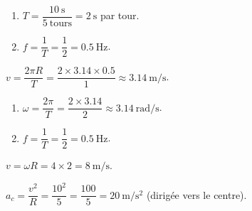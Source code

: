 \documentclass[11pt,a4paper]{article}
\begin{document}

\begin{corrige}
\begin{enumerate}[label=\alph*)]
  \item $T=\dfrac{\qty{10}{\second}}{5\ \text{tours}}=\qty{2}{\second}$ par tour.
  \item $f=\dfrac{1}{T}=\dfrac{1}{2}=\qty{0,5}{\hertz}$.
\end{enumerate}
\end{corrige}

\begin{corrige}
$v=\dfrac{2\pi R}{T}=\dfrac{2\times\num{3,14}\times\num{0,5}}{1}\approx\qty{3,14}{\metre\per\second}$.
\end{corrige}

\begin{corrige}
\begin{enumerate}[label=\alph*)]
  \item $\omega=\dfrac{2\pi}{T}=\dfrac{2\times\num{3,14}}{2}\approx\qty{3,14}{\radian\per\second}$.
  \item $f=\dfrac{1}{T}=\dfrac{1}{2}=\qty{0,5}{\hertz}$.
\end{enumerate}
\end{corrige}

\begin{corrige}
$v=\omega R=4\times 2=\qty{8}{\metre\per\second}$.
\end{corrige}

\begin{corrige}
$a_c=\dfrac{v^2}{R}=\dfrac{10^2}{5}=\dfrac{100}{5}=\qty{20}{\metre\per\second\squared}$ (dirigée vers le centre).
\end{corrige}
\end{document}
